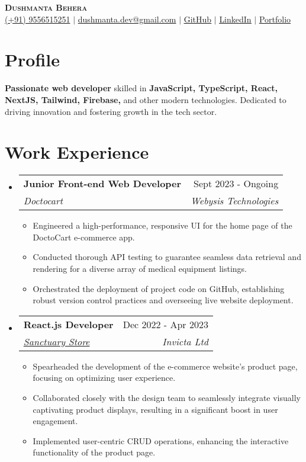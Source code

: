 \documentclass[letterpaper,11pt]{article}
\makeatletter
\newcommand{\resumeItem}[1]{
  \item\small{
    {#1 \vspace{-2pt}}
  }
}
\newcommand{\resumeSubheading}[4]{
  \vspace{-2pt}\item
    \begin{tabular*}{0.97\textwidth}[t]{l@{\extracolsep{\fill}}r}
      \textbf{#1} & #2 \\
      \textit{\small#3} & \textit{\small #4} \\
    \end{tabular*}\vspace{-7pt}
}
\newcommand{\resumeSubHeadingListStart}{\begin{itemize}[leftmargin=0.15in, label={}]}
\newcommand{\resumeSubHeadingListEnd}{\end{itemize}}
\newcommand{\resumeItemListStart}{\begin{itemize}}
\newcommand{\resumeItemListEnd}{\end{itemize}\vspace{-5pt}}
\makeatother
\begin{document}

\begin{center}
   \textbf{\Huge \scshape Dushmanta Behera} \\ \vspace{1pt}
    \small 
    \raisebox{-0.05\height}{\faPhone*} \href{tel:+919556515251}{{(+91) 9556515251}} $|$ 
    \raisebox{-0.05\height}{\faEnvelope} \href{mailto:dushmanta0511@gmail.com}{{dushmanta.dev@gmail.com}} $|$ 
    \raisebox{-0.05\height}{\faGithub} \href{https://github.com/dushmanta05}{{\underline{GitHub}}}
     $|$ 
    \raisebox{-0.05\height}{\faLinkedin} \href{https://www.linkedin.com/in/dushmanta05/}{{\underline{LinkedIn}}}
    $|$ 
    \raisebox{-0.05\height}{\faGlobe} \href{https://dushmanta.is-a.dev/}{{\underline{Portfolio}}}
    
    
\end{center}

\section{Profile}
    
\textbf{Passionate web developer} skilled in \textbf{JavaScript, TypeScript, React, NextJS, Tailwind, Firebase,} and other modern technologies. Dedicated to driving innovation and fostering growth in the tech sector.

\section{Work Experience}
  \resumeSubHeadingListStart
  \resumeSubheading
      {Junior Front-end Web Developer}{Sept 2023 - Ongoing}
      {{Doctocart}}{Webysis Technologies}
      \resumeItemListStart
       \resumeItem{Engineered a high-performance, responsive UI for the home page of the DoctoCart e-commerce app.}
        \resumeItem{Conducted thorough API testing to guarantee seamless data retrieval and rendering for a diverse array of medical equipment listings.}
         \resumeItem{Orchestrated the deployment of project code on GitHub, establishing robust version control practices and overseeing live website deployment.}
    \resumeItemListEnd
  \resumeSubheading
      {React.js Developer}{Dec 2022 - Apr 2023}
      {\href{https://sanctuarystore.co.nz/} {Sanctuary Store}}{Invicta Ltd}
      \resumeItemListStart
       \resumeItem{Spearheaded the development of the e-commerce website's product page, focusing on optimizing user experience.}
        \resumeItem{Collaborated closely with the design team to seamlessly integrate visually captivating product displays, resulting in a significant boost in user engagement.}
         \resumeItem{Implemented user-centric CRUD operations, enhancing the interactive functionality of the product page.}
    \resumeItemListEnd
  \resumeSubHeadingListEnd
\end{document}
